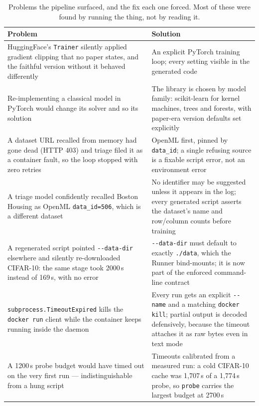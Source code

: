 \documentclass[11pt]{article}
\newcommand{\squeeze}{\setlength{\tabcolsep}{4pt}}
\begin{document}
\begin{table}[tbp]
\centering
\small
\caption{Problems the pipeline surfaced, and the fix each one forced. Most of these were found by
running the thing, not by reading it.}
\label{tab:problems}
\squeeze
\begin{tabular}{L{0.47\textwidth}L{0.47\textwidth}}
\toprule
Problem & Solution \\
\midrule
HuggingFace's \texttt{Trainer} silently applied gradient clipping that no paper states, and the
  faithful version without it behaved differently & An explicit PyTorch training loop; every
  setting visible in the generated code \\
Re-implementing a classical model in PyTorch would change its solver and so its solution & The
  library is chosen by model family: scikit-learn for kernel machines, trees and forests, with
  paper-era version defaults set explicitly \\
A dataset URL recalled from memory had gone dead (HTTP 403) and triage filed it as a container
  fault, so the loop stopped with zero retries & OpenML first, pinned by \texttt{data\_id}; a
  single refusing source is a fixable script error, not an environment error \\
A triage model confidently recalled Boston Housing as OpenML \texttt{data\_id=506}, which is a
  different dataset & No identifier may be suggested unless it appears in the log; every generated
  script asserts the dataset's name and row/column counts before training \\
A regenerated script pointed \texttt{-{}-data-dir} elsewhere and silently re-downloaded CIFAR-10:
  the same stage took 2000\,s instead of 169\,s, with no error & \texttt{-{}-data-dir} must default
  to exactly \texttt{./data}, which the Runner bind-mounts; it is now part of the enforced
  command-line contract \\
\texttt{subprocess.TimeoutExpired} kills the \texttt{docker run} client while the container keeps
  running inside the daemon & Every run gets an explicit \texttt{-{}-name} and a matching
  \texttt{docker kill}; partial output is decoded defensively, because the timeout attaches it as
  raw bytes even in text mode \\
A 1200\,s probe budget would have timed out on the very first run --- indistinguishable from a hung
  script & Timeouts calibrated from a measured run: a cold CIFAR-10 cache was 1{,}707\,s of a
  1{,}774\,s probe, so \texttt{probe} carries the largest budget at 2700\,s \\

\end{tabular}
\end{table}
\end{document}
